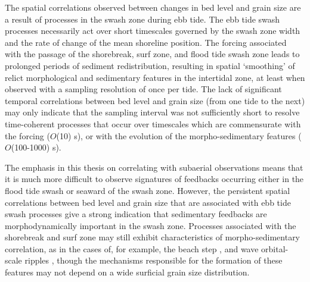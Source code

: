 
The spatial correlations observed between changes in bed level and grain size are a result of processes in the swash zone during ebb tide. The ebb tide swash processes necessarily act over short timescales governed by the swash zone width and the rate of change of the mean shoreline position. The forcing associated with the passage of the shorebreak, surf zone, and flood tide swash zone leads to prolonged periods of sediment redistribution, resulting in spatial `smoothing' of relict morphological and sedimentary features in the intertidal zone, at least when observed with a sampling resolution of once per tide. The lack of significant temporal correlations between bed level and grain size (from one tide to the next) may only indicate that the sampling interval was not sufficiently short to resolve time-coherent processes that occur over timescales which are commensurate with the forcing ($O$(10) s), or with the evolution of the morpho-sedimentary features ($O$(100-1000) s). 

The emphasis in this thesis on correlating with subaerial observations means that it is much more difficult to observe signatures of feedbacks occurring either in the flood tide swash or seaward of the swash zone. However, the persistent spatial correlations between bed level and grain size that are associated with ebb tide swash processes give a strong indication that sedimentary feedbacks are morphodynamically important in the swash zone. Processes associated with the shorebreak and surf zone may still exhibit characteristics of morpho-sedimentary correlation, as in the cases of, for example, the beach step \citep{Austin_Buscombe2008}, and wave orbital-scale ripples \citep{Hay_etal2014}, though the mechanisms responsible for the formation of these features may not depend on a wide surficial grain size distribution. 

